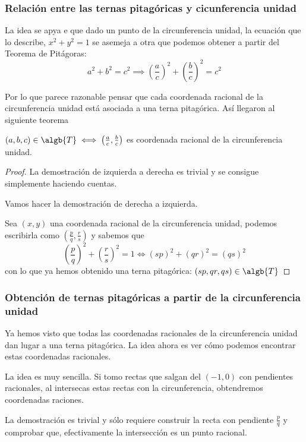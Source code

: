 \documentclass{apuntes}
\begin{document}
\subsubsection{Relación entre las ternas pitagóricas y cicunferencia unidad}

La idea se apya e que dado un punto de la circunferencia unidad, la ecuación que lo describe, $x^2+y^2=1$ se asemeja a otra que podemos obtener a partir del Teorema de Pitágoras:
\[a^2+b^2=c^2 \implies \left(\frac{a}{c}\right)^2 + \left(\frac{b}{c} \right)^2 = c^2\]

Por lo que parece razonable pensar que cada coordenada racional de la circunferencia unidad está asociada a una terna pitagórica. Así llegaron al siguiente teorema

\begin{theorem}
$(a,b,c)\in \algb{T} \iff \left( \frac{a}{c},\frac{b}{c}\right)$ es coordenada racional de la circunferencia unidad. 
\end{theorem}
\begin{proof}
La demostración de izquierda a derecha es trivial y se consigue simplemente haciendo cuentas.

Vamos hacer la demostración de derecha a izquierda.

Sea $(x,y)$ una coordenada racional de la circunferencia unidad, podemos escribirla como $(\frac{p}{q},\frac{r}{s})$ y sabemos que
\[\left( \frac{p}{q}\right)^2 + \left( \frac{r}{s}\right)^2 = 1 \iff (sp)^2+(qr)^2=(qs)^2\]
con lo que ya hemos obtenido una terna pitagórica: $(sp,qr,qs)\in \algb{T}$ 
\end{proof}

\subsubsection{Obtención de ternas pitagóricas a partir de la circunferencia unidad}

Ya hemos visto que todas las coordenadas racionales de la circunferencia unidad dan lugar a una terna pitagórica. La idea ahora es ver cómo podemos encontrar estas coordenadas racionales.

La idea es muy sencilla. Si tomo rectas que salgan del $(-1,0)$ con pendientes racionales, al intersecas estas rectas con la circunferencia, obtendremos coordenadas raciones.

La demostración es trivial y sólo requiere construir la recta con pendiente $\frac{p}{q}$ y comprobar que, efectivamente la intersección es un punto racional.
\end{document}
